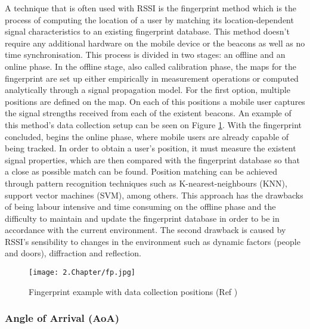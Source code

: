  
A technique that is often used with \ac{RSSI} is the fingerprint method which is the process of computing the location of a user by matching its location-dependent signal characteristics to an existing fingerprint database. This method doesn't require any additional hardware on the mobile device or the beacons as well as no time synchronisation. This process is divided in two stages: an offline and an online phase. In the offline stage, also called calibration phase, the maps for the fingerprint are set up either empirically in measurement operations or computed analytically through a signal propagation model. For the first option, multiple positions are defined on the map. On each of this positions a mobile user captures the signal strengths received from each of the existent beacons. An example of this method's data collection setup can be seen on Figure \ref{fig:fp}. With the fingerprint concluded, begins the online phase, where mobile users are already capable of being tracked. In order to obtain a user's position, it must measure the existent signal properties, which are then compared with the fingerprint database so that a close as possible match can be found. Position matching can be achieved through pattern recognition techniques such as K-nearest-neighbours (KNN), support vector machines (SVM), among others. 
This approach has the drawbacks of being labour intensive and time consuming on the offline phase and the difficulty to maintain and update the fingerprint database in order to be in accordance with the current environment. The second drawback is caused by \ac{RSSI}'s sensibility to changes in the environment such as dynamic factors (people and doors), diffraction and reflection.  
 
\begin{figure}[H] 
\centering 
\texttt{[image: 2.Chapter/fp.jpg]} 
\caption[Fingerprint example with data collection positions (Ref \cite{fingerprint}) ]{ Fingerprint example with data collection positions (Ref \cite{fingerprint}) } 
\label{fig:fp} 
\end{figure} 
 
 
\subsubsection{Angle of Arrival (AoA) } 
\label{subsubsec:aoa} 
 
